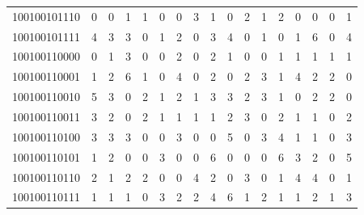 \documentclass[10pt,a4paper]{article}
\begin{document}
\begin{longtable}{ |c|c|c|c|c|c|c|c|c|c|c|c|c|c|c|c|c| }
    100100101110              & 0                            & 0                                & 1                            & 1                              & 0   & 0   & 3   & 1   & 0   & 2   & 1   & 2   & 0   & 0   & 0   & 1   \\
    100100101111              & 4                            & 3                                & 3                            & 0                              & 1   & 2   & 0   & 3   & 4   & 0   & 1   & 0   & 1   & 6   & 0   & 4   \\
    100100110000              & 0                            & 1                                & 3                            & 0                              & 0   & 2   & 0   & 2   & 1   & 0   & 0   & 1   & 1   & 1   & 1   & 1   \\
    100100110001              & 1                            & 2                                & 6                            & 1                              & 0   & 4   & 0   & 2   & 0   & 2   & 3   & 1   & 4   & 2   & 2   & 0   \\
    100100110010              & 5                            & 3                                & 0                            & 2                              & 1   & 2   & 1   & 3   & 3   & 2   & 3   & 1   & 0   & 2   & 2   & 0   \\
    100100110011              & 3                            & 2                                & 0                            & 2                              & 1   & 1   & 1   & 1   & 2   & 3   & 0   & 2   & 1   & 1   & 0   & 2   \\
    100100110100              & 3                            & 3                                & 3                            & 0                              & 0   & 3   & 0   & 0   & 5   & 0   & 3   & 4   & 1   & 1   & 0   & 3   \\
    100100110101              & 1                            & 2                                & 0                            & 0                              & 3   & 0   & 0   & 6   & 0   & 0   & 0   & 6   & 3   & 2   & 0   & 5   \\
    100100110110              & 2                            & 1                                & 2                            & 2                              & 0   & 0   & 4   & 2   & 0   & 3   & 0   & 1   & 4   & 4   & 0   & 1   \\
    100100110111              & 1                            & 1                                & 1                            & 0                              & 3   & 2   & 2   & 4   & 6   & 1   & 2   & 1   & 1   & 2   & 1   & 3   \\

\end{longtable}
\end{document}
